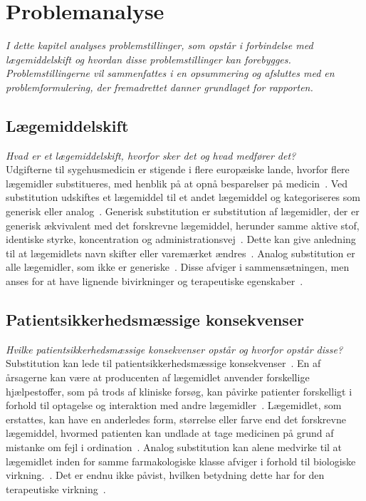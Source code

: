 \chapter{Problemanalyse}
\textit{I dette kapitel analyses problemstillinger, som opstår i forbindelse med lægemiddelskift og hvordan disse problemstillinger kan forebygges. Problemstillingerne vil sammenfattes i en opsummering og afsluttes med en problemformulering, der fremadrettet danner grundlaget for rapporten.}

\section{Lægemiddelskift}
\textit{Hvad er et lægemiddelskift, hvorfor sker det og hvad medfører det?} \\
Udgifterne til sygehusmedicin er stigende i flere europæiske lande, hvorfor flere lægemidler substitueres, med henblik på at opnå besparelser på medicin~\citep{Ess2003,Johnston2011}. Ved substitution udskiftes et lægemiddel til et andet lægemiddel og kategoriseres som generisk eller analog~\citep{DanskSelskabforPatientsikkerhed2009, Kairi2017}. Generisk substitution er substitution af lægemidler, der er  generisk ækvivalent med det forskrevne lægemiddel, herunder samme aktive stof, identiske styrke, koncentration og administrationsvej~\citep{DanskSelskabforPatientsikkerhed2009, Kairi2017}. Dette kan give anledning til at lægemidlets navn skifter eller varemærket ændres~\citep{Kairi2017}. Analog substitution er alle lægemidler, som ikke er generiske~\citep{Kairi2017}. Disse afviger i sammensætningen, men anses for at have lignende bivirkninger og terapeutiske egenskaber~\citep{DanskSelskabforPatientsikkerhed2009, Kairi2017}.


\section{Patientsikkerhedsmæssige konsekvenser} \label{sec:ProblemLaeg} %
\textit{Hvilke patientsikkerhedsmæssige konsekvenser opstår og hvorfor opstår disse?} \\
Substitution kan lede til patientsikkerhedsmæssige konsekvenser~\citep{DanskSelskabforPatientsikkerhed2009}. En af årsagerne kan være at producenten af lægemidlet anvender forskellige hjælpestoffer, som på trods af kliniske forsøg, kan påvirke patienter forskelligt i forhold til optagelse og interaktion med andre lægemidler~\citep{Kairi2017}. Lægemidlet, som erstattes, kan have en anderledes form, størrelse eller farve end det forskrevne lægemiddel, hvormed patienten kan undlade at tage medicinen på grund af mistanke om fejl i ordination~\citep{Kairi2017}. Analog substitution kan alene medvirke til at lægemidlet inden for samme farmakologiske klasse afviger i forhold til biologiske virkning.~\citep{Kairi2017}. Det er endnu ikke påvist, hvilken betydning dette har for den terapeutiske virkning~\citep{Kairi2017}. 

